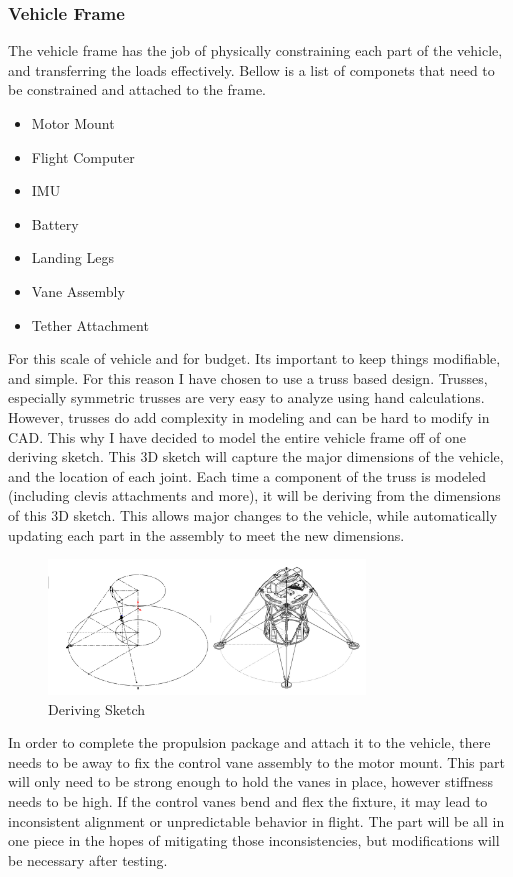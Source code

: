 \documentclass[12pt,letterpaper]{article}
\begin{document}
\subsubsection{Vehicle Frame}

The vehicle frame has the job of physically constraining each part of the vehicle, and transferring the loads effectively. Bellow is a list of componets that need to be constrained and attached to the frame.

\begin{itemize}
\item Motor Mount
\item Flight Computer
\item IMU
\item Battery
\item Landing Legs
\item Vane Assembly
\item Tether Attachment
\end{itemize}

For this scale of vehicle and for budget. Its important to keep things modifiable, and simple. For this reason I have chosen to use a truss based design. Trusses, especially symmetric trusses are very easy to analyze using hand calculations. However, trusses do add complexity in modeling and can be hard to modify in CAD. This why I have decided to model the entire vehicle frame off of one deriving sketch. This 3D sketch will capture the major dimensions of the vehicle, and the location of each joint. Each time a component of the truss is modeled (including clevis attachments and more), it will be deriving from the dimensions of this 3D sketch. This allows major changes to the vehicle, while automatically updating each part in the assembly to meet the new dimensions. 

\begin{figure}[h!]
\centering
\includegraphics[width = 0.75\textwidth]{Vehicle_Frame_Fig/Deriving_Sketch.png}
\caption*{Deriving Sketch }
\end{figure}

In order to complete the propulsion package and attach it to the vehicle, there needs to be away to fix the control vane assembly to the motor mount. This part will only need to be strong enough to hold the vanes in place, however stiffness needs to be high. If the control vanes bend and flex the fixture, it may lead to inconsistent alignment or unpredictable behavior in flight. The part will be all in one piece in the hopes of mitigating those inconsistencies, but modifications will be necessary after testing.\\\\
\end{document}
